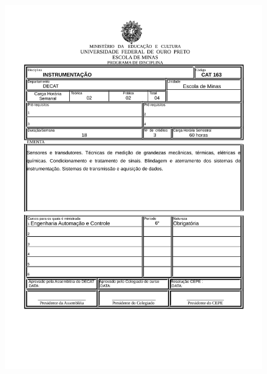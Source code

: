 \begin{figure}[p]
	\centering 
	\includegraphics[scale=0.7]{capitulos/anexo1-programas-disciplina/p61.pdf}
\end{figure}

